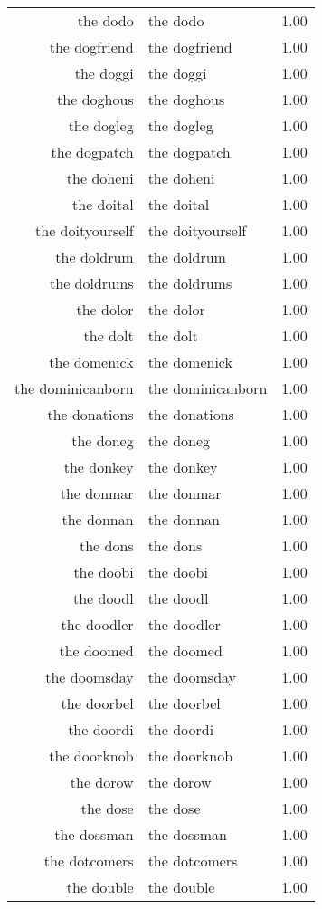 \begin{table}[ht]
\begin{tabular}{rlr}
  the dodo & the dodo & 1.00 \\ 
  the dogfriend & the dogfriend & 1.00 \\ 
  the doggi & the doggi & 1.00 \\ 
  the doghous & the doghous & 1.00 \\ 
  the dogleg & the dogleg & 1.00 \\ 
  the dogpatch & the dogpatch & 1.00 \\ 
  the doheni & the doheni & 1.00 \\ 
  the doital & the doital & 1.00 \\ 
  the doityourself & the doityourself & 1.00 \\ 
  the doldrum & the doldrum & 1.00 \\ 
  the doldrums & the doldrums & 1.00 \\ 
  the dolor & the dolor & 1.00 \\ 
  the dolt & the dolt & 1.00 \\ 
  the domenick & the domenick & 1.00 \\ 
  the dominicanborn & the dominicanborn & 1.00 \\ 
  the donations & the donations & 1.00 \\ 
  the doneg & the doneg & 1.00 \\ 
  the donkey & the donkey & 1.00 \\ 
  the donmar & the donmar & 1.00 \\ 
  the donnan & the donnan & 1.00 \\ 
  the dons & the dons & 1.00 \\ 
  the doobi & the doobi & 1.00 \\ 
  the doodl & the doodl & 1.00 \\ 
  the doodler & the doodler & 1.00 \\ 
  the doomed & the doomed & 1.00 \\ 
  the doomsday & the doomsday & 1.00 \\ 
  the doorbel & the doorbel & 1.00 \\ 
  the doordi & the doordi & 1.00 \\ 
  the doorknob & the doorknob & 1.00 \\ 
  the dorow & the dorow & 1.00 \\ 
  the dose & the dose & 1.00 \\ 
  the dossman & the dossman & 1.00 \\ 
  the dotcomers & the dotcomers & 1.00 \\ 
  the double & the double & 1.00 \\ 

\end{tabular}
\end{table}
